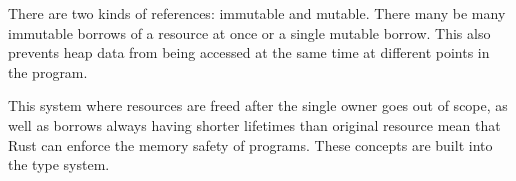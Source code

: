 There are two kinds of references: immutable and mutable. There many be many
immutable borrows of a resource at once or a single mutable borrow. This also
prevents heap data from being accessed at the same time at different points in
the program.

This system where resources are freed after the single owner goes out of scope,
as well as borrows always having shorter lifetimes than original resource
mean that Rust can enforce the memory safety of programs. These concepts are
built into the type system.

